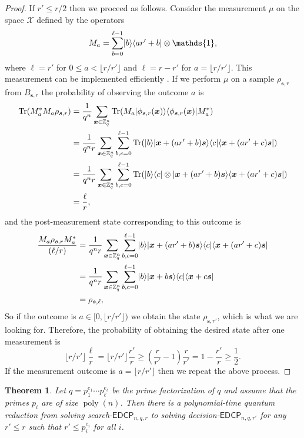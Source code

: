 \documentclass[11pt]{article}
\theoremstyle{plain}
\newtheorem{theorem}{Theorem}
\theoremstyle{definition}
\DeclareMathOperator{\tr}{Tr} %
\DeclareMathOperator{\poly}{poly}
\DeclarePairedDelimiter{\ket}{\lvert}{\rangle}
\DeclarePairedDelimiter{\bra}{\langle}{\rvert}
\def\Z{\ensuremath{\mathbb{Z}}}
\def\edcp{\ensuremath{\mathsf{EDCP}}}
\begin{document}
\begin{proof}
    If $r' \le r / 2$ then we proceed as follows. Consider the measurement $\mu$ on the space $\mathcal{X}$ defined by the operators
    \[ M_a = \sum_{b = 0}^{\ell - 1} \ket{b}\bra{ar' + b} \otimes \mathds{1}, \]
    where $\ell = r'$ for $0 \le a < \lfloor r / r'  \rfloor$ and $\ell = r - r'$ for $a = \lfloor r / r'  \rfloor$. This measurement can be implemented efficiently \cite{kaye2007introduction}. If we perform $\mu$ on a sample $\rho_{\bm{s}, r}$ from $B_{\bm{s}, r}$ the probability of observing the outcome $a$ is
    \begin{align*}
        \tr(M_a^*M_a \rho_{\bm{s}, r})
        & = \frac{1}{q^n} \sum_{\bm{x} \in \Z_q^n} \tr(M_a \ket{\phi_{\bm{s}, r}(\bm{x})} \bra{\phi_{\bm{s}, r}(\bm{x})} M_a^*) \\
        & = \frac{1}{q^nr} \sum_{\bm{x} \in \Z_q^n} \sum_{b, c = 0}^{\ell - 1} \tr(\ket{b}\ket{\bm{x} + (ar' + b)\bm{s}} \bra{c}\bra{\bm{x} + (ar' + c)\bm{s}}) \\
        & = \frac{1}{q^nr} \sum_{\bm{x} \in \Z_q^n} \sum_{b, c = 0}^{\ell - 1} \tr(\ket{b}\bra{c} \otimes \ket{\bm{x} + (ar' + b)\bm{s}} \bra{\bm{x} + (ar' + c)\bm{s}}) \\
        & = \frac{\ell}{r},
    \end{align*}
    and the post-measurement state corresponding to this outcome is
    \begin{align*}
        \frac{M_a \rho_{\bm{s}, r} M_a^*}{(\ell / r)}
        & = \frac{1}{q^nr} \sum_{\bm{x} \in \Z_q^n} \sum_{b, c = 0}^{\ell - 1} \ket{b}\ket{\bm{x} + (ar' + b)\bm{s}} \bra{c}\bra{\bm{x} + (ar' + c)\bm{s}} \\
        & = \frac{1}{q^nr} \sum_{\bm{x} \in \Z_q^n} \sum_{b, c = 0}^{\ell - 1} \ket{b}\ket{\bm{x} + b\bm{s}} \bra{c}\bra{\bm{x} + c\bm{s}} \\
        & = \rho_{\bm{s}, \ell},
    \end{align*}
    So if the outcome is $a \in [0, \lfloor r / r'  \rfloor)$ we obtain the state $\rho_{\bm{s}, r'}$, which is what we are looking for. Therefore, the probability of obtaining the desired state after one measurement is
    \[ \lfloor r / r' \rfloor \frac{\ell}{r} = \lfloor r / r' \rfloor \frac{r'}{r} \ge \left( \frac{r}{r'} - 1 \right)\frac{r}{r'} = 1 - \frac{r'}{r} \ge \frac{1}{2}. \]
    If the measurement outcome is $a = \lfloor r / r' \rfloor$ then we repeat the above process.
\end{proof}
\begin{theorem}
    Let $q = p_1^{e_1} \cdots p_\ell^{e_\ell}$ be the prime factorization of $q$ and assume that the primes $p_i$ are of size $\poly(n)$. Then there is a polynomial-time quantum reduction from solving search-$\edcp_{n, q, r}$ to solving decision-$\edcp_{n, q, r'}$ for any $r' \le r$ such that $r' \le p_i^{e_i}$ for all $i$. 
\end{theorem}
\end{document}
